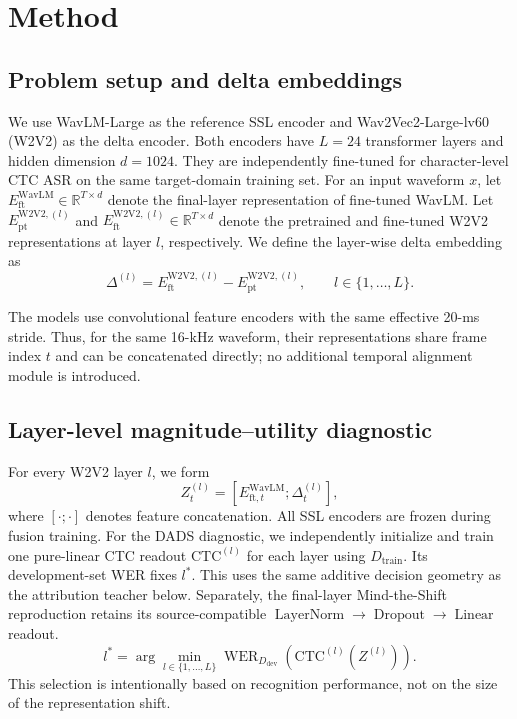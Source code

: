 \documentclass{article}
\begin{document}
\section{Method}
\label{sec:method}

\subsection{Problem setup and delta embeddings}

We use WavLM-Large as the reference SSL encoder and Wav2Vec2-Large-lv60 (W2V2) as the delta encoder. Both encoders have $L=24$ transformer layers and hidden dimension $d=1024$. They are independently fine-tuned for character-level CTC ASR on the same target-domain training set. For an input waveform $x$, let $E^{\mathrm{WavLM}}_{\mathrm{ft}}\in\mathbb{R}^{T\times d}$ denote the final-layer representation of fine-tuned WavLM. Let $E^{\mathrm{W2V2},(l)}_{\mathrm{pt}}$ and $E^{\mathrm{W2V2},(l)}_{\mathrm{ft}}\in\mathbb{R}^{T\times d}$ denote the pretrained and fine-tuned W2V2 representations at layer $l$, respectively. We define the layer-wise delta embedding as
\begin{equation}
\Delta^{(l)}=E^{\mathrm{W2V2},(l)}_{\mathrm{ft}}-E^{\mathrm{W2V2},(l)}_{\mathrm{pt}},
\qquad l\in\{1,\ldots,L\}.
\label{eq:delta}
\end{equation}

The models use convolutional feature encoders with the same effective 20-ms stride. Thus, for the same 16-kHz waveform, their representations share frame index $t$ and can be concatenated directly; no additional temporal alignment module is introduced.

\subsection{Layer-level magnitude--utility diagnostic}
\label{sec:layer-utility}

For every W2V2 layer $l$, we form
\begin{equation}
Z_t^{(l)}=\left[E^{\mathrm{WavLM}}_{\mathrm{ft},t};\Delta_t^{(l)}\right],
\label{eq:layer-fusion}
\end{equation}
where $[\cdot;\cdot]$ denotes feature concatenation. All SSL encoders are frozen during fusion training. For the DADS diagnostic, we independently initialize and train one pure-linear CTC readout $\mathrm{CTC}^{(l)}$ for each layer using $D_{\mathrm{train}}$. Its development-set WER fixes $l^*$. This uses the same additive decision geometry as the attribution teacher below. Separately, the final-layer Mind-the-Shift reproduction retains its source-compatible $\operatorname{LayerNorm}\rightarrow\operatorname{Dropout}\rightarrow\operatorname{Linear}$ readout.
\begin{equation}
l^*=\arg\min_{l\in\{1,\ldots,L\}}
\operatorname{WER}_{D_{\mathrm{dev}}}
\left(\mathrm{CTC}^{(l)}(Z^{(l)})\right).
\label{eq:best-layer}
\end{equation}
This selection is intentionally based on recognition performance, not on the size of the representation shift.
\end{document}
